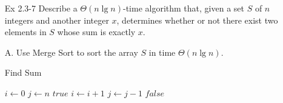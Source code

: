 \documentclass[fontsize=12pt,paper=a4]{book}
\begin{document}
\begin{enumerate}
	\item[Ex 2.3-7]
		Describe a $\Theta(n \lg n)$-time algorithm that, given a set $S$ of $n$ integers and another integer $x$, determines whether or not there exist two elements in $S$ whose sum is exactly $x$.			
	\item[A.]
	Use Merge Sort to sort the array $S$ in time $\Theta(n \lg n)$.\\
	\begin{algorithm}
		\caption{Find Sum}
		\begin{algorithmic}[1]
				\State $i \gets 0$
				\State $j \gets n$
						\State \Return $true$
					\EndIf
				\EndWhile
					\State $i \gets i+1$
				\EndIf
					\State $j \gets j-1$
				\EndIf
				\State \Return $false$
			\EndProcedure			
		\end{algorithmic}
	\end{algorithm}
\end{enumerate}
\end{document}
